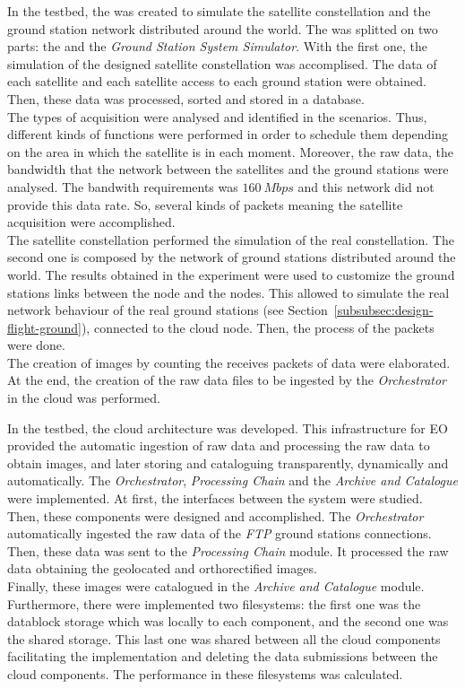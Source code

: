 In the \vw testbed, the \sss was created to simulate the satellite
constellation and the ground station network distributed around the world.
The \sss was splitted on two parts: the \satss and the \emph{Ground Station
  System Simulator}. With the first one, the simulation of
the designed satellite constellation was accomplised. The data of each satellite and each
satellite access to each ground station were obtained. Then, these data was
processed, sorted and stored in a database. \\
The types of acquisition were
analysed and identified in the scenarios. Thus, different kinds of functions
were performed in order to schedule them depending on the area in which the
satellite is in each moment. Moreover, the raw data, the bandwidth that the
network between the satellites and the ground stations were analysed. The
bandwith requirements was $160~Mbps$ and this network did not provide this data
rate. So, several kinds of packets meaning the satellite acquisition were
accomplished. \\
The satellite constellation performed the simulation of the real constellation.
The second one is composed by the network of ground stations distributed around
the world. The results obtained in the \pl experiment were used to customize the
ground stations links
between the node and the \bonfire nodes. This allowed to simulate the real
network behaviour of the real ground
stations (see Section~\ref{subsubsec:design-flight-ground}), connected to the \bonfire cloud
node. Then, the process of the packets were done. \\
The creation of images by
counting the receives packets of data were elaborated. At the end, the creation
of the raw data files to be ingested by the \emph{Orchestrator} in the cloud was
performed.


In the \bonfire testbed, the cloud architecture was developed. This
infrastructure for \ac{EO} provided the automatic ingestion of raw data and processing the raw data to
obtain images, and later storing and cataloguing transparently, dynamically and automatically. The \emph{Orchestrator}, \emph{Processing Chain} and the \emph{Archive and
  Catalogue} were implemented. At first, the interfaces between the system were
studied. Then, these components were designed and accomplished. The
\emph{Orchestrator} automatically ingested the raw data of the \emph{FTP} ground
stations connections. Then, these data was sent to the \emph{Processing Chain}
module. It processed the raw data obtaining the geolocated and orthorectified
images.  \\
Finally, these images were catalogued in the \emph{Archive and
  Catalogue} module. Furthermore, there were implemented two filesystems: the
first one was the datablock storage which was locally to each component, and the
second one was the shared storage. This last one was shared between all the cloud
components facilitating the implementation and deleting the data submissions
between the cloud components. The performance in these filesystems was
calculated. 


